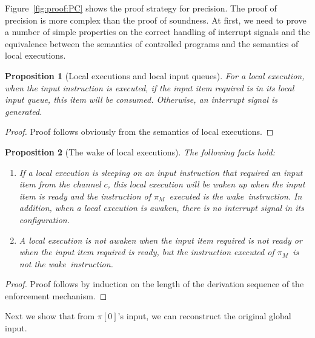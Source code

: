 \documentclass[10pt,a4paper,oneside]{article}
\newtheorem{proposition}{Proposition}[section]
\def\ProgM{\ensuremath{\Prog_{M}}}
\def\chnl{\ensuremath{c}}
\def\Prog{\ensuremath{\pi}}
\def\Progl#1{\ensuremath{\Prog[#1]}}
\def\NWAKE{wake}
\begin{document}
Figure~\ref{fig:proof:PC} shows the proof strategy for precision.
The proof of precision is more complex than the proof of soundness. At first, we need to prove a number of simple properties on the correct handling of interrupt signals and the equivalence between the semantics of controlled programs and the semantics of local executions.



\begin{proposition}[Local executions and local input queues] \label{prop:reuse:local}
For a local execution, when the input instruction is executed, if the input item required is in its local input queue, this item will be consumed. Otherwise, an interrupt signal is generated.
\end{proposition}
\begin{proof}
Proof follows obviously from the semantics of local executions.
\end{proof}

\begin{proposition}[The wake of local executions]
\label{prop:reuse:global}
The following facts hold:
\begin{enumerate}
\item If a local execution is sleeping on an input instruction that required an input item from the channel \chnl, this local execution will be waken up when the input item is ready and the instruction of \ProgM\ executed is the \NWAKE\ instruction. In addition, when a local execution is awaken, there is no interrupt signal in its configuration.

\item A local execution is not awaken when the input item required is not ready or when the input item required is ready, but the instruction executed of \ProgM\ is not the \NWAKE\ instruction.

\end{enumerate}
\end{proposition}

\begin{proof}
Proof follows by induction on the length of the derivation sequence of the enforcement mechanism.
\end{proof}

Next we show that from \Progl{0}'s input, we can reconstruct the original global input.
\end{document}
